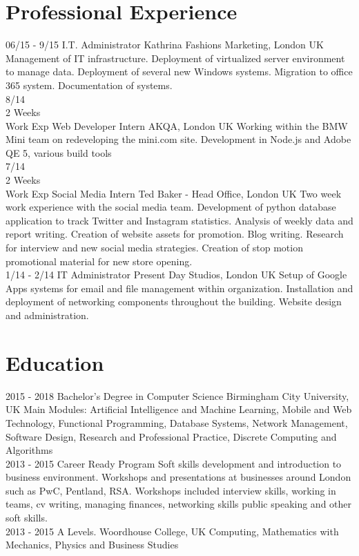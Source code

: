 \documentclass[]{friggeri-cv}
\begin{document}
\section{Professional Experience}
\begin{entrylist}
  \entry
    {06/15 - 9/15}
    {I.T. Administrator}
    {Kathrina Fashions Marketing, London UK}
    {Management of IT infrastructure.
Deployment of virtualized server environment to manage data.
Deployment of several new Windows systems.
Migration to office 365 system.
Documentation of systems.\\}
  \entry
    {8/14  \\2 Weeks \\ Work Exp   }
    {Web Developer Intern}
    {AKQA, London UK}
    {Working within the BMW Mini team on redeveloping the mini.com site.
Development in Node.js and Adobe QE 5, various build tools\\}
    \entry
    {7/14 \\2 Weeks \\ Work Exp}
    {Social Media Intern}
    {Ted Baker - Head Office, London UK}
    {Two week work experience with the social media team. 
Development of python database application to track Twitter and Instagram statistics.
Analysis of weekly data and report writing.
Creation of website assets for promotion.
Blog writing.
Research for interview and new social media strategies.
Creation of stop motion promotional material for new store opening.\\}
    \entry
    {1/14 - 2/14}
    {IT Administrator}
    {Present Day Studios, London UK}
 {Setup of Google Apps systems for email and file management within organization.
Installation and deployment of networking components throughout the building.
Website design and administration.\\}
\end{entrylist}

\section{Education}
\begin{entrylist}
  \entry
    {2015 - 2018}
    {Bachelor's Degree in Computer Science}
    {Birmingham City University, UK}
    {Main Modules: Artificial Intelligence and Machine Learning, Mobile and Web Technology, Functional Programming, Database Systems, Network Management, Software Design, Research and Professional Practice, Discrete Computing and Algorithms\\}
  \entry
    {2013 - 2015}
    {Career Ready Program}
    {}
    {Soft skills development and introduction to business environment.
Workshops and presentations at businesses around London such as PwC, Pentland, RSA.
Workshops included interview skills, working in teams, cv writing, managing finances, networking skills public speaking and other soft skills.\\}
  \entry
    {2013 - 2015}
    {A Levels.}
    {Woordhouse College, UK}
    {Computing, Mathematics with Mechanics, Physics and Business Studies}
\end{entrylist}
\end{document}
